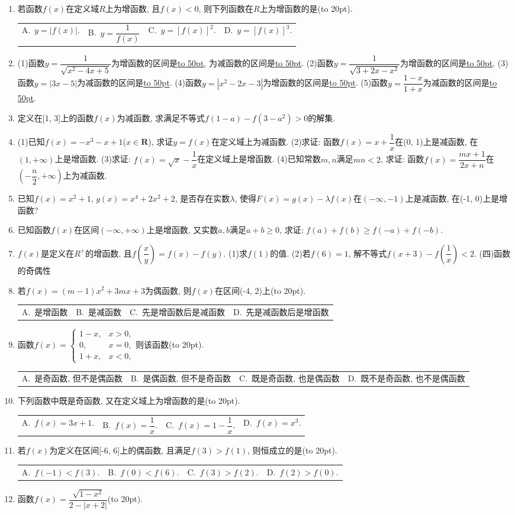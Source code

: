 \documentclass[10pt,a4paper]{article}
\newcommand{\blank}[1]{\underline{\hbox to #1pt{}}}
\newcommand{\bracket}[1]{(\hbox to #1pt{})}
\newcommand{\fourch}[4]{\par\begin{tabular}{p{.23\textwidth}p{.23\textwidth}p{.23\textwidth}p{.23\textwidth}}
A.~#1 &B.~#2& C.~#3& D.~#4
\end{tabular}}
\begin{document}
\begin{enumerate}[1.]
\item 若函数$f(x)$在定义域$R$上为增函数, 且$f(x)<0$, 则下列函数在$R$上为增函数的是\bracket{20}.
\fourch{$y=|f(x)|.$}{$y=\dfrac 1{f(x)}$}{$y=[ f(x) ]^2.$}{$y=[ f(x) ]^3.$}
\item (1)函数$y=\dfrac 1{\sqrt {x^2-4x+5}}$为增函数的区间是\blank{50}, 为减函数的区间是\blank{50}.
(2)函数$y=\dfrac 1{\sqrt {3+2x-x^2}}$为增函数的区间是\blank{50}.
(3)函数$y=|3x-5|$为减函数的区间是\blank{50}.
(4)函数$y=|x^2-2x-3|$为增函数的区间是\blank{50}.
(5)函数$y=\dfrac{1-x}{1+x}$为减函数的区间是\blank{50}.
\item 定义在[1, 3]上的函数$f(x)$为减函数, 求满足不等式$f(1-a)-f(3-a^2)>0$的解集.
\item (1)已知$f(x)=-x^3-x+1$($x\in \mathbf{R}$), 求证$y=f(x)$在定义域上为减函数.
(2)求证: 函数$f(x)=x+\dfrac 1x$在(0, 1)上是减函数, 在$(1,+\infty)$上是增函数.
(3)求证: $f(x)=\sqrt x-\dfrac 1x$在定义域上是增函数.
(4)已知常数$m,n$满足$mn<2$, 求证: 函数$f(x)=\dfrac{mx+1}{2x+n}$在$(-\dfrac n2,+\infty)$上为减函数.
\item 已知$f(x)=x^2+1$, $g(x)=x^4+2x^2+2$, 是否存在实数$\lambda$, 使得$F(x)=g(x)-\lambda f(x)$在$(-\infty ,-1)$上是减函数, 在(-1, 0)上是增函数?
\item 已知函数$f(x)$在区间$(-\infty ,+\infty)$上是增函数, 又实数$a,b$满足$a+b\ge 0$, 求证: $f(a)+f(b)\ge f(-a)+f(-b)$.
\item $f(x)$是定义在$R^+$的增函数, 且$f(\dfrac xy)=f(x)-f(y)$.
(1)求$f(1)$的值.
(2)若$f(6)=1$, 解不等式$f(x+3)-f(\dfrac 1x)<2$.
(四)函数的奇偶性
\item 若$f(x)=(m-1)x^2+3mx+3$为偶函数, 则$f(x)$在区间(-4, 2)上\bracket{20}.
\fourch{是增函数}{是减函数}{先是增函数后是减函数}{先是减函数后是增函数}
\item 函数$f(x)=\begin{cases}   1-x, & x>0,  \\ 0, & x=0,  \\1+x, & x<0,  \end{cases}$则该函数\bracket{20}.
\fourch{是奇函数, 但不是偶函数}{是偶函数, 但不是奇函数}{既是奇函数, 也是偶函数}{既不是奇函数, 也不是偶函数}
\item 下列函数中既是奇函数, 又在定义域上为增函数的是\bracket{20}.
\fourch{$f(x)=3x+1.$}{$f(x)=\dfrac 1x.$}{$f(x)=1-\dfrac 1x.$}{$f(x)=x^3.$}
\item 若$f(x)$为定义在区间[-6, 6]上的偶函数, 且满足$f(3)>f(1)$, 则恒成立的是\bracket{20}.
\fourch{$f(-1)<f(3).$}{$f(0)<f(6).$}{$f(3)>f(2).$}{$f(2)>f(0).$}
\item 函数$f(x)=\dfrac{\sqrt {1-x^2}}{2-|x+2|}$\bracket{20}.

\end{enumerate}
\end{document}
